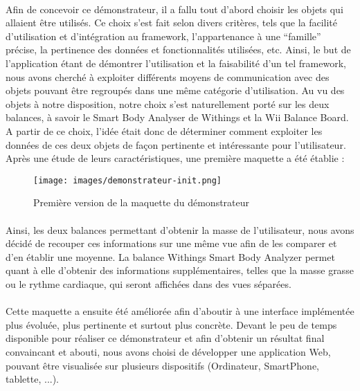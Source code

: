 \documentclass[nocopyrightspace]{sigplanconf}
\begin{document}
			\paragraph{}
			Afin de concevoir ce démonstrateur, il a fallu tout d’abord choisir les objets qui allaient être utilisés. Ce choix s’est fait selon divers critères, tels que la facilité d’utilisation et d’intégration au framework, l’appartenance à une “famille” précise, la pertinence des données et fonctionnalités utilisées, etc. Ainsi, le but de l’application étant de démontrer l’utilisation et la faisabilité d’un tel framework, nous avons cherché à exploiter différents moyens de communication avec des objets pouvant être regroupés dans une même catégorie d’utilisation. Au vu des objets à notre disposition, notre choix s’est naturellement porté sur les deux balances, à savoir le Smart Body Analyser de Withings et la Wii Balance Board. A partir de ce choix, l’idée était donc de déterminer comment exploiter les données de ces deux objets de façon pertinente et intéressante pour l’utilisateur. Après une étude de leurs caractéristiques, une première maquette a été établie :

			\begin{figure}[h]
				\centering
				\texttt{[image: images/demonstrateur-init.png]}
				\caption{Première version de la maquette du démonstrateur}
			\end{figure}

			\paragraph{}
			Ainsi, les deux balances permettant d’obtenir la masse de l’utilisateur, nous avons décidé de recouper ces informations sur une même vue afin de les comparer et d’en établir une moyenne. La balance Withings Smart Body Analyzer permet quant à elle d’obtenir des informations supplémentaires, telles que la masse grasse ou le rythme cardiaque, qui seront affichées dans des vues séparées.

			\paragraph{}
			Cette maquette a ensuite été améliorée afin d’aboutir à une interface implémentée plus évoluée, plus pertinente et surtout plus concrète. Devant le peu de temps disponible pour réaliser ce démonstrateur et afin d’obtenir un résultat final convaincant et abouti, nous avons choisi de développer une application Web, pouvant être visualisée sur plusieurs dispositifs (Ordinateur, SmartPhone, tablette, ...). 
\end{document}
